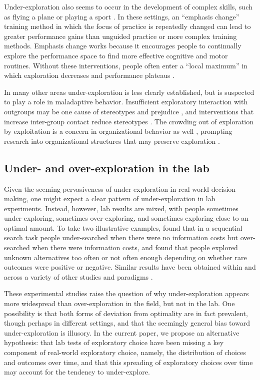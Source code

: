 \documentclass[10pt,letterpaper]{article}
\begin{document}
Under-exploration also seems to occur in the development of complex skills, such
as flying a plane or playing a sport \citep{Gopher1989}. In these settings, an ``emphasis
change'' training method in which the focus of practice is repeatedly changed
can lead to greater performance gains than unguided practice or more complex
training methods. Emphasis change works because it encourages people to
continually explore the performance space to find more effective cognitive and
motor routines. Without these interventions, people often enter a ``local
maximum'' in which exploration decreases and performance plateaus \citep{Yechiam2001}.

In many other areas under-exploration is less clearly
established, but is suspected to play a role in maladaptive behavior.
Insufficient exploratory interaction with outgroups may be one cause of
stereotypes and prejudice \citep{Denrell2005most}, and interventions that
increase inter-group contact reduce stereotypes \citep{Shook2008}. The crowding
out of exploration by exploitation is a concern in organizational behavior as
well \citep{March1991, Levinthal1993}, prompting research into organizational
structures that may preserve exploration \citep{Fang2010}.

\subsection{Under- and over-exploration in the lab}

Given the seeming pervasiveness of under-exploration in real-world decision
making, one might expect a clear pattern of under-exploration in lab
experiments. Instead, however, lab results are mixed, with people sometimes
under-exploring, sometimes over-exploring, and sometimes exploring close to an
optimal amount. To take two illustrative examples, \citet{Zwick2003} found that
in a sequential search task people under-searched when there were no information
costs but over-searched when there were information costs, and
\citet{Teodorescu2014} found that people explored unknown alternatives too often
or not often enough depending on whether rare outcomes were positive or
negative. Similar results have been obtained within and across a variety of
other studies and paradigms
\citep{tversky1966information, Busemeyer1988, hertwig2004decisions, Navarro2016, Juni2016, Sang2011}.

These experimental studies raise the question of why under-exploration appears
more widespread than over-exploration in the field, but not in the lab. One
possibility is that both forms of deviation from optimality are in fact
prevalent, though perhaps in different settings, and that the seemingly general bias
toward under-exploration is illusory. In the current paper, we propose an
alternative hypothesis: that lab tests of exploratory choice have been missing a key component
of real-world exploratory choice, namely, the distribution of choices and
outcomes over time, and that this spreading of exploratory choices over time may
account for the tendency to under-explore.
\end{document}
